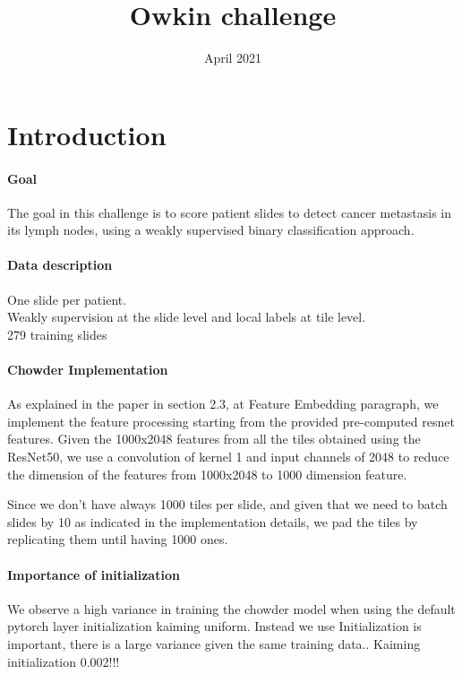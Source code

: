 \documentclass{article}
\title{Owkin challenge}
\author{ }
\date{April 2021}
\begin{document}
\maketitle

\section{Introduction}

\paragraph{Goal}
The goal in this challenge is to score patient slides to detect cancer metastasis in its lymph nodes, using a weakly supervised  binary classification approach.

\paragraph{Data description}
One slide per patient. \\
Weakly supervision at the slide level and local labels at tile level.\\
279 training slides


\paragraph{Chowder Implementation}
As explained in the paper in section 2.3, at Feature Embedding paragraph, we implement the feature processing starting from the provided pre-computed resnet features. 
Given the 1000x2048 features from all the tiles obtained using the ResNet50, we use a convolution of kernel 1 and input channels of 2048 to reduce the dimension of the features from 1000x2048 to 1000 dimension feature.

Since we don't have always 1000 tiles per slide, and given that we need to batch slides by 10 as indicated in the implementation details, we pad the tiles by replicating them until having 1000 ones.


\paragraph{Importance of initialization}
We observe a high variance in training the chowder model when using the default pytorch layer initialization kaiming uniform. Instead we use
Initialization is important, there is a large variance given the same training data..
Kaiming initialization 0.002!!!



\end{document}
